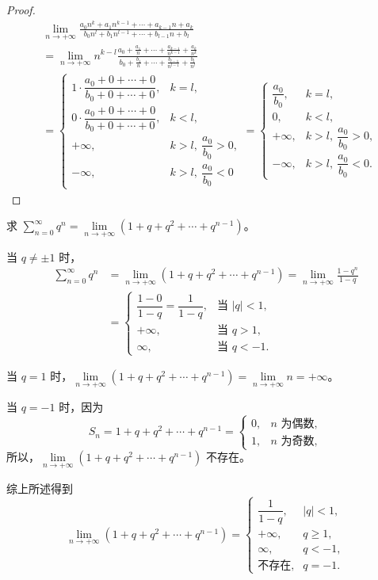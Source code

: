 \begin{proof}
\begin{align*}
&\lim_{n\to+\infty}\frac{a_0n^k+a_1n^{k-1}+\cdots+a_{k-1}n+a_k}{b_0n^l+b_1n^{l-1}+\cdots+b_{l-1}n+b_l} \\
&= \lim_{n\to+\infty}n^{k-l}\frac{a_0+\frac{a_1}{n}+\cdots+\frac{a_{k-1}}{n^{k-1}}+\frac{a_k}{n^k}}{b_0+\frac{b_1}{n}+\cdots+\frac{b_{l-1}}{n^{l-1}}+\frac{b_l}{n^l}} \\
&= \begin{cases}
1 \cdot \dfrac{a_0+0+\cdots+0}{b_0+0+\cdots+0}, & k=l, \\
0 \cdot \dfrac{a_0+0+\cdots+0}{b_0+0+\cdots+0}, & k<l, \\
+\infty, & k>l,\ \dfrac{a_0}{b_0}>0, \\
-\infty, & k>l,\ \dfrac{a_0}{b_0}<0
\end{cases}
= \begin{cases}
\dfrac{a_0}{b_0}, & k=l, \\
0, & k<l, \\
+\infty, & k>l,\ \dfrac{a_0}{b_0}>0, \\
-\infty, & k>l,\ \dfrac{a_0}{b_0}<0.
\end{cases}
\end{align*}
\end{proof}

\begin{example}\label{ex:1.2.3}
求 $\sum\limits_{n=0}^{\infty} q^{n} = \lim\limits_{n \to +\infty} (1 + q + q^{2} + \cdots + q^{n-1})$。
\end{example}

\begin{solution}
当 $q \neq \pm 1$ 时，
\begin{align*}
\sum_{n=0}^{\infty}q^{n} &= \lim_{n\to+\infty}(1+q+q^{2}+\cdots+q^{n-1}) = \lim_{n\to+\infty}\frac{1-q^{n}}{1-q} \\
&= \begin{cases}
\dfrac{1-0}{1-q} = \dfrac{1}{1-q}, & \text{当 } |q|<1, \\
+\infty, & \text{当 } q>1, \\
\infty, & \text{当 } q<-1.
\end{cases}
\end{align*}

当 $q=1$ 时，$\lim\limits_{n\to+\infty}(1+q+q^{2}+\cdots+q^{n-1}) = \lim\limits_{n\to+\infty}n = +\infty$。

当 $q = -1$ 时，因为
\[
S_{n} = 1+q+q^{2}+\cdots+q^{n-1} = \begin{cases}
0, & n \text{ 为偶数}, \\
1, & n \text{ 为奇数},
\end{cases}
\]
所以，$\lim\limits_{n\to+\infty}(1+q+q^2+\cdots+q^{n-1})$ 不存在。

综上所述得到
\[
\lim_{n\to+\infty}(1+q+q^{2}+\cdots+q^{n-1}) = \begin{cases}
\dfrac{1}{1-q}, & |q|<1, \\
+\infty, & q\geqslant 1, \\
\infty, & q<-1, \\
\text{不存在}, & q=-1.
\end{cases}
\]
\end{solution}

